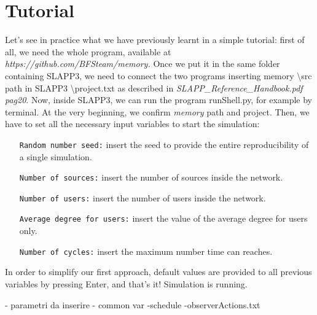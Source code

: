 \section{Tutorial}
Let's see in practice what we have previously learnt in a simple tutorial: first of all, we need the whole program, available at \textit{ https://github.com/BFSteam/memory.}
Once we put it in the same folder containing SLAPP3, we need to connect the two programs inserting memory \textbackslash src path in SLAPP3 \textbackslash project.txt as described in \textit{SLAPP\_Reference\_Handbook.pdf pag20}.
Now, inside SLAPP3, we can run the program runShell.py, for example by terminal.
At the very beginning, we confirm \textit{memory} path and project. Then, we have to set all the necessary input variables to start the simulation:
\begin{itemize}
\item[\texttt{Random number seed:}] insert the seed to provide the entire reproducibility of a single simulation.
\item[\texttt{Number of sources:}]insert the number of sources inside the network.
\item[\texttt{Number of users:}]insert the number of users inside the network.
\item[\texttt{Average degree for users:}]insert the value of the average degree for users only.
\item[\texttt{Number of cycles:}]insert the maximum number time can reaches.
\end{itemize}

In order to simplify our first approach, default values are provided to all previous variables by pressing Enter, and that's it!
Simulation is running. 
 



- parametri da inserire
- common var
-schedule
-observerActions.txt
